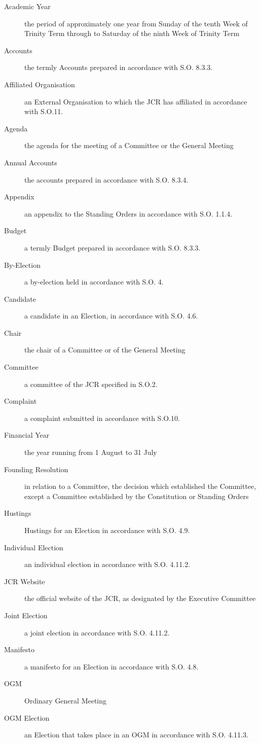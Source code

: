\begin{description}
\item[Academic Year] the period of approximately one year from Sunday of the tenth Week of Trinity Term through to Saturday of the ninth Week of Trinity Term 
\item[Accounts] the termly Accounts prepared in accordance with S.O. 8.3.3.
\item[Affiliated Organisation] an External Organisation to which the JCR has affiliated in accordance with S.O.11.
\item[Agenda] the agenda for the meeting of a Committee or the General Meeting
\item[Annual Accounts] the accounts prepared in accordance with S.O. 8.3.4.
\item[Appendix] an appendix to the Standing Orders in accordance with S.O. 1.1.4.
\item[Budget] a termly Budget prepared in accordance with S.O. 8.3.3.
\item[By-Election] a by-election held in accordance with S.O. 4.
\item[Candidate] a candidate in an Election, in accordance with S.O. 4.6.
\item[Chair] the chair of a Committee or of the General Meeting
\item[Committee] a committee of the JCR specified in S.O.2.
\item[Complaint] a complaint submitted in accordance with S.O.10.
\item[Financial Year] the year running from 1 August to 31 July
\item[Founding Resolution] in relation to a Committee, the decision which established the Committee, except a Committee established by the Constitution or Standing Orders
\item[Hustings] Hustings for an Election in accordance with S.O. 4.9.
\item[Individual Election] an individual election in accordance with S.O. 4.11.2.
\item[JCR Website] the official website of the JCR, as designated by the Executive Committee
\item[Joint Election] a joint election in accordance with S.O. 4.11.2.
\item[Manifesto] a manifesto for an Election in accordance with S.O. 4.8.
\item[OGM] Ordinary General Meeting
\item[OGM Election] an Election that takes place in an OGM in accordance with S.O. 4.11.3.

\end{description}
